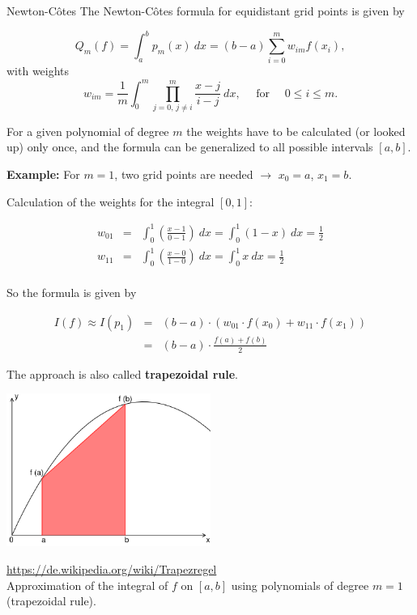 \begin{vbframe}{Newton-C\^{o}tes}
The Newton-C\^{o}tes formula for equidistant grid points is given by

$$
Q_m(f) = \int_a^b p_m(x)~dx = (b - a)\sum_{i = 0}^m w_{im} f(x_i),
$$
with weights
$$
w_{im} = \frac{1}{m} \int_0^m \prod_{j = 0,\, j \not= i}^m \frac{x - j}{i - j} ~ dx,
  \quad \text{ for } \quad 0 \leq i \leq m.
$$

For a given polynomial of degree $m$ the weights have to be calculated (or looked up) only once, and the formula can be generalized to all possible intervals $[a, b]$.

\framebreak

\textbf{Example:} For $m = 1$, two grid points are needed $\to$ $x_0 = a$, $x_1 = b$.

\vspace{0.2cm}

Calculation of the weights for the integral $[0, 1]$:

\vspace*{-0.3cm}

\begin{eqnarray*}
w_{01} &=& \int_0^1 \left( \frac{x - 1}{0 - 1} \right)~dx = \int_0^1 (1 - x)~dx = \frac{1}{2} \\
w_{11} &=& \int_0^1 \left( \frac{x - 0}{1 - 0} \right)~dx = \int_0^1 x~dx = \frac{1}{2} \\[0.3cm]
\end{eqnarray*}

\vspace*{-0.3cm}

So the formula is given by

\vspace*{-0.2cm}

\begin{eqnarray*}
I(f) \approx I(p_1) &=& (b - a)\cdot (w_{01} \cdot f(x_0) +  w_{11} \cdot f(x_1))  \\
&=& (b - a)  \cdot \frac{f(a) + f(b)}{2}
\end{eqnarray*}


\framebreak

The approach is also called \textbf{trapezoidal rule}.

\begin{center}
\includegraphics[width=0.5\textwidth]{figure_man/trapezregel.png}
\begin{footnotesize}
\url{https://de.wikipedia.org/wiki/Trapezregel}\\
Approximation of the integral of $f$ on $[a, b]$ using polynomials of degree $m = 1$ (trapezoidal rule).
\end{footnotesize}
\end{center}

\end{vbframe}


